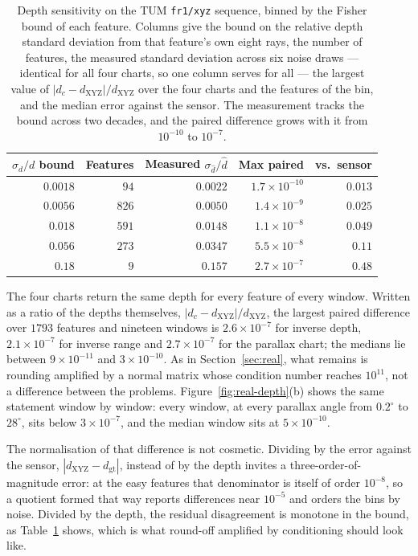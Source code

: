 \documentclass[11pt,a4paper]{article}
\theoremstyle{definition}
\theoremstyle{remark}
\begin{document}
\begin{table}[!t]
\centering
\caption{Depth sensitivity on the TUM \texttt{fr1/xyz} sequence, binned by the Fisher bound of each feature. Columns give the bound on the relative depth standard deviation from that feature's own eight rays, the number of features, the measured standard deviation across six noise draws --- identical for all four charts, so one column serves for all --- the largest value of $|d_c-d_{\mathrm{XYZ}}|/d_{\mathrm{XYZ}}$ over the four charts and the features of the bin, and the median error against the sensor. The measurement tracks the bound across two decades, and the paired difference grows with it from $10^{-10}$ to $10^{-7}$.}
\label{tab:real-depth}
\small
\setlength{\tabcolsep}{5pt}
\begin{tabular}{rrrrr}
\toprule
$\sigma_d/d$ bound & Features & Measured $\sigma_{\hat d}/\hat d$ & Max paired & vs.\ sensor\\
\midrule
$0.0018$ & $94$  & $0.0022$ & $1.7\times10^{-10}$ & $0.013$\\
$0.0056$ & $826$ & $0.0050$ & $1.4\times10^{-9}$  & $0.025$\\
$0.018$  & $591$ & $0.0148$ & $1.1\times10^{-8}$  & $0.049$\\
$0.056$  & $273$ & $0.0347$ & $5.5\times10^{-8}$  & $0.11$\\
$0.18$   & $9$   & $0.157$  & $2.7\times10^{-7}$  & $0.48$\\
\bottomrule
\end{tabular}
\end{table}

The four charts return the same depth for every feature of every window. Written as a ratio of the depths themselves, $|d_c-d_{\mathrm{XYZ}}|/d_{\mathrm{XYZ}}$, the largest paired difference over $1793$ features and nineteen windows is $2.6\times10^{-7}$ for inverse depth, $2.1\times10^{-7}$ for inverse range and $2.7\times10^{-7}$ for the parallax chart; the medians lie between $9\times10^{-11}$ and $3\times10^{-10}$. As in Section~\ref{sec:real}, what remains is rounding amplified by a normal matrix whose condition number reaches $10^{11}$, not a difference between the problems. Figure~\ref{fig:real-depth}(b) shows the same statement window by window: every window, at every parallax angle from $0.2^\circ$ to $28^\circ$, sits below $3\times10^{-7}$, and the median window sits at $5\times10^{-10}$.

The normalisation of that difference is not cosmetic. Dividing by the error against the sensor, $|d_{\mathrm{XYZ}}-d_{\mathrm{gt}}|$, instead of by the depth invites a three-order-of-magnitude error: at the easy features that denominator is itself of order $10^{-8}$, so a quotient formed that way reports differences near $10^{-5}$ and orders the bins by noise. Divided by the depth, the residual disagreement is monotone in the bound, as Table~\ref{tab:real-depth} shows, which is what round-off amplified by conditioning should look like.
\end{document}
